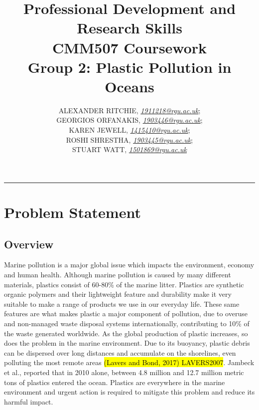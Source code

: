 \documentclass[10pt]{article}\usepackage[]{graphicx}\usepackage[]{color}
\begin{document}
\title{\LARGE Professional Development and Research Skills \\ CMM507 Coursework  \\ Group 2: Plastic Pollution in Oceans}

\author{ALEXANDER RITCHIE, \textit{\href{1911218@rgu.ac.uk}{1911218@rgu.ac.uk}};\\ GEORGIOS ORFANAKIS, \textit{\href{1903446@rgu.ac.uk}{1903446@rgu.ac.uk}};\\ KAREN JEWELL, \textit{\href{1415410@rgu.ac.uk}{1415410@rgu.ac.uk}};\\ ROSHI SHRESTHA, \textit{\href{1903445@rgu.ac.uk}{1903445@rgu.ac.uk}};\\ STUART WATT, \textit{\href{1501869@rgu.ac.uk}{1501869@rgu.ac.uk}}}

\maketitle
\noindent\rule{16cm}{0.4pt}


\section{Problem Statement}

\subsection{Overview}\label{over}

Marine pollution is a major global issue which impacts the environment, economy and human health. Although marine pollution is caused by many different materials, plastics consist of 60-80\% of the marine litter. \cite{DERRAIK2002} \cite{SMITH2013} \cite{KUO2014} \cite{ZHOU2011} \cite{JANG2014} Plastics are synthetic organic polymers and their lightweight feature and durability make it very suitable to make a range of products we use in our everyday life.\cite{BARNES2009} \cite{SIVAN2011} These same features are what makes plastic a major component of pollution, due to overuse and non-managed waste disposal systems internationally, contributing to 10\% of the waste generated worldwide.\cite{BARNES2009} As the global production of plastic increases, so does the problem in the marine environment. Due to its buoyancy, plastic debris can be dispersed over long distances and accumulate on the shorelines, even polluting the most remote areas \hl{(Lavers and Bond, 2017) LAVERS2007}. Jambeck et al.,\cite{JAMBECK2015} reported that in 2010 alone, between 4.8 million and 12.7 million metric tons of plastics entered the ocean. Plastics are everywhere in the marine environment and urgent action is required to mitigate this problem and reduce its harmful impact.\cite{RIOS2007} \cite{ROCHMAN2015} \\
\end{document}
